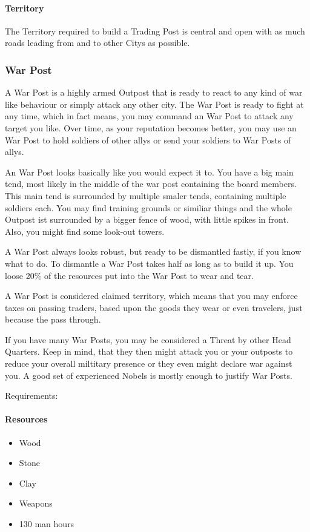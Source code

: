 \documentclass[10pt,twoside,twocolumn,openany]{book}
\begin{document}
\paragraph{Territory}

The Territory required to build a Trading Post is central and open with as much roads leading from and to other Citys as possible.

\subsubsection{War Post}

A War Post is a highly armed Outpost that is ready to react to any kind of war like behaviour or simply attack any other city. The War Post is ready to fight at any time, which in fact means, you may command an War Post to attack any target you like. Over time, as your reputation becomes better, you may use an War Post to hold soldiers of other allys or send your soldiers to War Posts of allys.

An War Post looks basically like you would expect it to. You have a big main tend, most likely in the middle of the war post containing the board members. This main tend is surrounded by multiple smaler tends, containing multiple soldiers each. You may find training grounds or similiar things and the whole Outpost ist surrounded by a bigger fence of wood, with little spikes in front. Also, you might find some look-out towers.

A War Post always looks robust, but ready to be dismantled fastly, if you know what to do. To dismantle a War Post takes half as long as to build it up. You loose 20\% of the resources put into the War Post to wear and tear.

A War Post is considered claimed territory, which means that you may enforce taxes on passing traders, based upon the goods they wear or even travelers, just because the pass through.

If you have many War Posts, you may be considered a Threat by other Head Quarters. Keep in mind, that they then might attack you or your outposts to reduce your overall miltitary presence or they even might declare war against you. A good set of experienced Nobels is mostly enough to justify War Posts.

Requirements:

\paragraph{Resources}
\begin{itemize}
\item Wood
\item Stone
\item Clay
\item Weapons
\item 130 man hours
\end{itemize}
\end{document}
